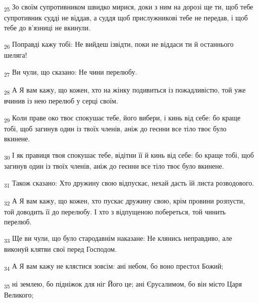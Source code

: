 \begin{tcolorbox}
\textsubscript{25} Зо своїм супротивником швидко мирися, доки з ним на дорозі ще ти, щоб тебе супротивник судді не віддав, а суддя щоб прислужникові тебе не передав, і щоб тебе до в'язниці не вкинули.
\end{tcolorbox}
\begin{tcolorbox}
\textsubscript{26} Поправді кажу тобі: Не вийдеш ізвідти, поки не віддаси ти й останнього шеляга!
\end{tcolorbox}
\begin{tcolorbox}
\textsubscript{27} Ви чули, що сказано: Не чини перелюбу.
\end{tcolorbox}
\begin{tcolorbox}
\textsubscript{28} А Я вам кажу, що кожен, хто на жінку подивиться із пожадливістю, той уже вчинив із нею перелюб у серці своїм.
\end{tcolorbox}
\begin{tcolorbox}
\textsubscript{29} Коли праве око твоє спокушає тебе, його вибери, і кинь від себе: бо краще тобі, щоб загинув один із твоїх членів, аніж до геєнни все тіло твоє було вкинене.
\end{tcolorbox}
\begin{tcolorbox}
\textsubscript{30} І як правиця твоя спокушає тебе, відітни її й кинь від себе: бо краще тобі, щоб загинув один із твоїх членів, аніж до геєнни все тіло твоє було вкинене.
\end{tcolorbox}
\begin{tcolorbox}
\textsubscript{31} Також сказано: Хто дружину свою відпускає, нехай дасть їй листа розводового.
\end{tcolorbox}
\begin{tcolorbox}
\textsubscript{32} А Я вам кажу, що кожен, хто пускає дружину свою, крім провини розпусти, той доводить її до перелюбу. І хто з відпущеною побереться, той чинить перелюб.
\end{tcolorbox}
\begin{tcolorbox}
\textsubscript{33} Ще ви чули, що було стародавнім наказане: Не клянись неправдиво, але виконуй клятви свої перед Господом.
\end{tcolorbox}
\begin{tcolorbox}
\textsubscript{34} А Я вам кажу не клястися зовсім: ані небом, бо воно престол Божий;
\end{tcolorbox}
\begin{tcolorbox}
\textsubscript{35} ні землею, бо підніжок для ніг Його це; ані Єрусалимом, бо він місто Царя Великого;
\end{tcolorbox}
